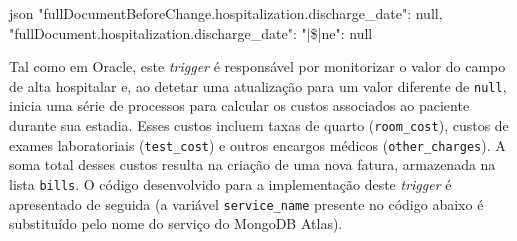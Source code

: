 \begin{myminted}{json}
{
    "fullDocumentBeforeChange.hospitalization.discharge_date": null,
    "fullDocument.hospitalization.discharge_date": {
        "|\$|ne": null
    }
}
\end{myminted}

Tal como em Oracle, este \textit{trigger} é responsável por monitorizar o valor do campo de alta hospitalar e, ao detetar uma atualização para um valor diferente de \texttt{null}, inicia uma série de processos para calcular os custos associados ao paciente durante sua estadia. Esses custos incluem taxas de quarto (\texttt{room\_cost}), custos de exames laboratoriais (\texttt{test\_cost}) e outros encargos médicos (\texttt{other\_charges}). A soma total desses custos resulta na criação de uma nova fatura, armazenada na lista \texttt{bills}. O código desenvolvido para a implementação deste \textit{trigger} é apresentado de seguida (a variável \texttt{service\_name} presente no código abaixo é substituído pelo nome do serviço do MongoDB Atlas).

